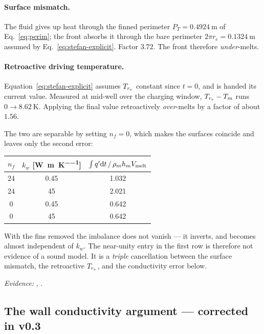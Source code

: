 \paragraph{Surface mismatch.} The fluid gives up heat through the finned
perimeter $P_{T}=\SI{0.4924}{\meter}$ of Eq.~\eqref{eq:perim}; the front absorbs
it through the bare perimeter $2\pi r_{e}=\SI{0.1324}{\meter}$ assumed by
Eq.~\eqref{eq:stefan-explicit}. Factor $3.72$. The front therefore
\emph{under}-melts.

\paragraph{Retroactive driving temperature.}
Equation~\eqref{eq:stefan-explicit} assumes $T_{r_{e}}$ constant since $t=0$, and is
handed its current value. Measured at mid-well over the charging window,
$T_{r_{e}}-T_{m}$ runs $0 \to \SI{8.62}{\kelvin}$. Applying the final value
retroactively \emph{over}-melts by a factor of about $1.56$.

The two are separable by setting $n_{f}=0$, which makes the surfaces coincide
and leaves only the second error:

\begin{center}
\begin{tabular}{@{}c c c@{}}
\toprule
$n_{f}$ & $k_{w}$ [\si{\watt\per\meter\per\kelvin}]
        & $\int q'\mathrm{d}t \,/\, \rho_{m}h_{m}V_{\mathrm{melt}}$ \\
\midrule
24 & 0.45 & 1.032 \\
24 & 45   & 2.021 \\
 0 & 0.45 & 0.642 \\
 0 & 45   & 0.642 \\
\bottomrule
\end{tabular}
\end{center}

With the fins removed the imbalance does not vanish --- it inverts, and becomes
almost independent of $k_{w}$. The near-unity entry in the first row is
therefore not evidence of a sound model. It is a \emph{triple} cancellation
between the surface mismatch, the retroactive $T_{r_{e}}$, and the conductivity error
below.

\emph{Evidence:} ,
.

\subsection{The wall conductivity argument --- corrected in v0.3}
\label{sec:defects:kw}

